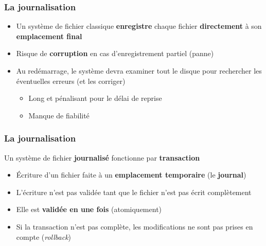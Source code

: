 \begin{frame}
\frametitle{La journalisation}
\begin{itemize}
\item Un système de fichier classique \textbf{enregistre} chaque fichier \textbf{directement} à son \textbf{emplacement final}
\item Risque de \textbf{corruption} en cas d'enregistrement partiel (panne)
\item Au redémarrage, le système devra examiner tout le disque pour rechercher les éventuelles erreurs (et les corriger)
\begin{itemize}
\item Long et pénalisant pour le délai de reprise
\item Manque de fiabilité
\end{itemize}
\end{itemize}
\end{frame}

\begin{frame}
\frametitle{La journalisation}
Un système de fichier \textbf{journalisé} fonctionne par \textbf{transaction}
\begin{itemize}
\item Écriture d'un fichier faite à un \textbf{emplacement temporaire} (le \textbf{journal})
\item L'écriture n'est pas validée tant que le fichier n'est pas écrit complètement
\item Elle est \textbf{validée en une fois} (atomiquement)
\item Si la transaction n'est pas complète, les modifications ne sont pas prises en compte (\textit{rollback})
\end{itemize}
\end{frame}

